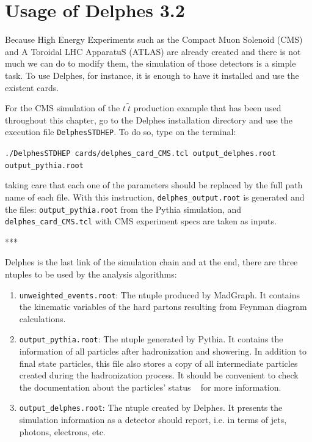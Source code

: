 \documentclass[12pt, oneside]{book}              %
\begin{document}
\section{Usage of Delphes 3.2} \label{sec:Delphes}

Because High Energy Experiments such as the Compact Muon Solenoid (CMS) and 
A Toroidal LHC ApparatuS (ATLAS) are already created and there is not much 
we can do to modify them, the simulation of those detectors is a simple task.
To use Delphes, for instance, it is enough to have it installed and use
the existent cards.

For the CMS simulation of the $ t\ \tilde{t} $ production example that
has been used throughout this chapter, go to the Delphes installation
directory and use the execution file \texttt{DelphesSTDHEP}. To do so,
type on the terminal:

\texttt{./DelphesSTDHEP cards/delphes\_card\_CMS.tcl output\_delphes.root output\_pythia.root}

\noindent taking care that each one of the parameters should be replaced
by the full path name of each file. With this instruction, 
\texttt{delphes\_output.root} is generated and the files: 
\texttt{output\_pythia.root} from the Pythia simulation, and
\texttt{delphes\_card\_CMS.tcl} with CMS experiment specs are taken
as inputs.

\begin{center}
***
\end{center}

Delphes is the last link of the simulation chain and at the end,
there are three ntuples to be used by the analysis algorithms:

\begin{enumerate}
\item \texttt{unweighted\_events.root}: The ntuple produced by MadGraph.
It contains the kinematic variables of the hard partons resulting from
Feynman diagram calculations.
\item \texttt{output\_pythia.root}: The ntuple generated by Pythia. It
contains the information of all particles after hadronization and showering.
In addition to final state particles, this file also stores a copy of all
intermediate particles created during the hadronization process. It should
be convenient to check the documentation about the particles' status 
~\cite{Sjostrand:2006za} for more information.
\item \texttt{output\_delphes.root}: The ntuple created by Delphes.
It presents the simulation information as a detector should report, i.e.
in terms of jets, photons, electrons, etc.
\end{enumerate}
\end{document}
